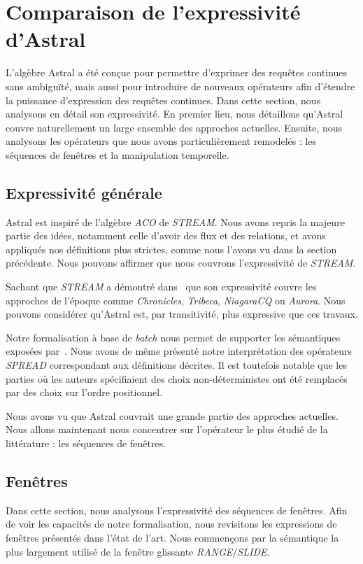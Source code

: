 \section{Comparaison de l'expressivité d'Astral}
L'algèbre Astral a été conçue pour permettre d'exprimer des requêtes continues sans ambiguïté, mais aussi pour introduire de nouveaux opérateurs afin d'étendre la puissance d'expression des requêtes continues. Dans cette section, nous analysons en détail son expressivité. En premier lieu, nous détaillons qu'Astral couvre naturellement un large ensemble des approches actuelles. Ensuite, nous analysons les opérateurs que nous avons particulièrement remodelés : les séquences de fenêtres et la manipulation temporelle.

\subsection{Expressivité générale}
Astral est inspiré de l'algèbre \textit{ACO} de \textit{STREAM}. Nous avons repris la majeure partie des idées, notamment celle d'avoir des flux et des relations, et avons appliqués nos définitions plus strictes, comme nous l'avons vu dans la section précédente. Nous pouvons affirmer que nous couvrons l'expressivité de \textit{STREAM}.

Sachant que \textit{STREAM} a démontré dans~\cite{Arasu:stream} que son expressivité couvre les approches de l'époque comme \textit{Chronicles}, \textit{Tribeca}, \textit{NiagaraCQ} ou \textit{Aurora}. Nous pouvons considérer qu'Astral est, par transitivité, plus expressive que ces travaux.

Notre formalisation à base de \textit{batch} nous permet de supporter les sémantiques exposées par~\cite{Jain:spread}. Nous avons de même présenté notre interprétation des opérateurs \textit{SPREAD} correspondant aux définitions décrites. Il est toutefois notable que les parties où les auteurs spécifiaient des choix non-déterministes ont été remplacés par des choix sur l'ordre positionnel.

Nous avons vu que Astral couvrait une grande partie des approches actuelles. Nous allons maintenant nous concentrer sur l'opérateur le plus étudié de la littérature : les séquences de fenêtres.

\subsection{Fenêtres}
Dans cette section, nous analysons l'expressivité des séquences de fenêtres. Afin de voir les capacités de notre formalisation, nous revisitons les expressions de fenêtres présentés dans l'état de l'art. Nous commençons par la sémantique la plus largement utilisé de la fenêtre glissante \textit{RANGE}/\textit{SLIDE}.
